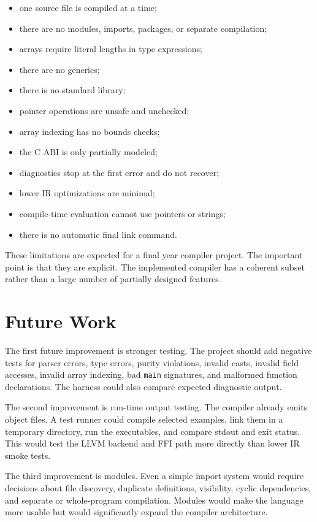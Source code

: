 \begin{itemize}
  \item one source file is compiled at a time;
  \item there are no modules, imports, packages, or separate compilation;
  \item arrays require literal lengths in type expressions;
  \item there are no generics;
  \item there is no standard library;
  \item pointer operations are unsafe and unchecked;
  \item array indexing has no bounds checks;
  \item the C ABI is only partially modeled;
  \item diagnostics stop at the first error and do not recover;
  \item lower IR optimizations are minimal;
  \item compile-time evaluation cannot use pointers or strings;
  \item there is no automatic final link command.
\end{itemize}

These limitations are expected for a final year compiler project. The important
point is that they are explicit. The implemented compiler has a coherent subset
rather than a large number of partially designed features.

\section{Future Work}

The first future improvement is stronger testing. The project should add
negative tests for parser errors, type errors, purity violations, invalid casts,
invalid field accesses, invalid array indexing, bad \texttt{main} signatures,
and malformed function declarations. The harness could also compare expected
diagnostic output.

The second improvement is run-time output testing. The compiler already emits
object files. A test runner could compile selected examples, link them in a
temporary directory, run the executables, and compare stdout and exit status.
This would test the LLVM backend and FFI path more directly than lower IR smoke
tests.

The third improvement is modules. Even a simple import system would require
decisions about file discovery, duplicate definitions, visibility, cyclic
dependencies, and separate or whole-program compilation. Modules would make the
language more usable but would significantly expand the compiler architecture.

